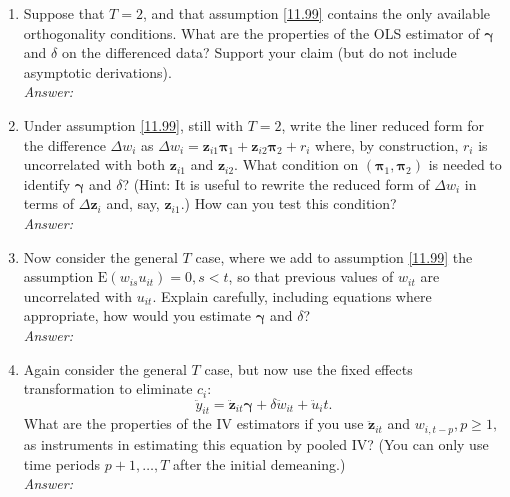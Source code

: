 \documentclass[10pt]{article}
\newcommand{\E}{\text{E}}
\begin{document}
\begin{enumerate}[label=\alph*.]
\item Suppose that $T=2$, and that assumption \eqref{11.99} contains the only available orthogonality conditions. What are the properties of the OLS estimator of $\pmb{\gamma}$ and $\delta$ on the differenced data? Support your claim (but do not include asymptotic derivations).
\\ \textit{Answer:}\\

\item Under assumption \eqref{11.99}, still with $T=2$, write the liner reduced form for the difference $\Delta w_i$ as $\Delta w_i=\textbf{z}_{i1}\pmb{\pi}_1+\textbf{z}_{i2}\pmb{\pi}_2+r_i$ where, by construction, $r_i$ is uncorrelated with both $\textbf{z}_{i1}$ and $\textbf{z}_{i2}$. What condition on $(\pmb{\pi}_1,\pmb{\pi}_2)$ is needed to identify $\pmb{\gamma}$ and $\delta$? (Hint: It is useful to rewrite the reduced form of $\Delta w_i$ in terms of $\Delta \textbf{z}_i$ and, say, $\textbf{z}_{i1}$.) How can you test this condition?
\\ \textit{Answer:}\\

\item Now consider the general $T$ case, where we add to assumption \eqref{11.99} the assumption $\E(w_{is}u_{it})=0,s<t$, so that previous values of $w_{it}$ are uncorrelated with $u_{it}$. Explain carefully, including equations where appropriate, how would you estimate $\pmb{\gamma}$ and $\delta$?
\\ \textit{Answer:}\\

\item Again consider the general $T$ case, but now use the fixed effects transformation to eliminate $c_i$:
\[\ddot{y}_{it}=\ddot{\textbf{z}}_{it}\pmb{\gamma}+\delta \ddot{w}_{it}+\ddot{u}_it.\]
What are the properties of the IV estimators if you use $\ddot{\textbf{z}}_{it}$ and $w_{i,t-p},p\geq 1,$ as instruments in estimating this equation by pooled IV? (You can only use time periods $p+1,\ldots,T$ after the initial demeaning.)
\\ \textit{Answer:}\\

\end{enumerate}
\end{document}
